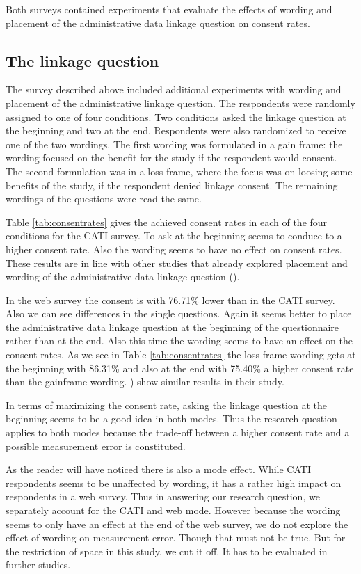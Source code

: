 Both surveys contained experiments that evaluate the effects of wording and placement of the administrative data linkage question on consent rates.

\subsection{The linkage question}

The survey described above included additional experiments with wording and placement of the administrative linkage question.  The respondents were randomly assigned to one of four conditions. Two conditions asked the linkage question at the beginning and two at the end. Respondents were also randomized to receive one of the two wordings. The first wording was formulated in a gain frame: the wording focused on the benefit for the study if the respondent would consent. The second formulation was in a loss frame, where the focus was on loosing some benefits of the study, if the respondent denied linkage consent. The remaining wordings of the questions were read the same.

Table \ref{tab:consentrates} gives the achieved consent rates in each of the four conditions for the CATI survey. To ask at the beginning seems to conduce to a higher consent rate. Also the wording seems to have no effect on consent rates. These results are in line with other studies that already explored placement and wording of the administrative data linkage question (\cite{Sakshaugetal13}).



In the web survey the consent is with 76.71\% lower than in the CATI survey. Also we can see differences in the single questions. Again it seems better to place the administrative data linkage question at the beginning of the questionnaire rather than at the end. Also this time the wording seems to have an effect on the consent rates. As we see in Table \ref{tab:consentrates} the loss frame wording gets at the beginning with 86.31\% and also at the end with 75.40\% a higher consent rate than the gainframe wording. \cite{Sakshaugetal13}) show similar results in their study.

In terms of maximizing the consent rate, asking the linkage question at the beginning seems to be a good idea in both modes. Thus the research question applies to both modes because the trade-off between a higher consent rate and a possible measurement error is constituted. 

As the reader will have noticed there is also a mode effect. While CATI respondents seems to be unaffected by wording, it has a rather high impact on respondents in a web survey. Thus in answering our research question, we separately account for the CATI and web mode. However because the wording seems to only have an effect at the end of the web survey, we do not explore the effect of wording on measurement error. Though that must not be true. But for the restriction of space in this study, we cut it off. It has to be evaluated in further studies.


